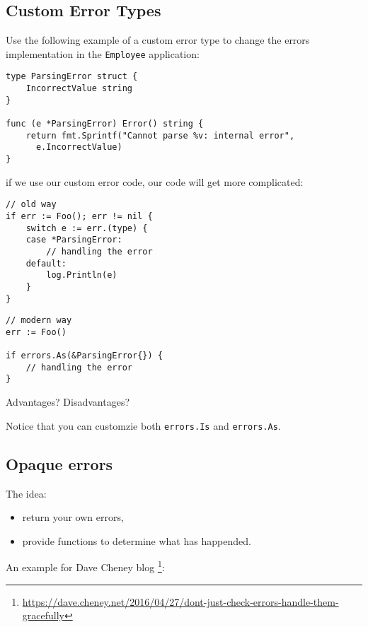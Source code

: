 \documentclass[11pt, letterpaper]{article}
\begin{document}
\subsection{Custom Error Types}

Use the following example of a custom error type to change the errors implementation in the \verb|Employee| application:

\begin{verbatim}
type ParsingError struct {
    IncorrectValue string
}

func (e *ParsingError) Error() string {
    return fmt.Sprintf("Cannot parse %v: internal error",
      e.IncorrectValue)
}
\end{verbatim}

if we use our custom error code, our code will get more complicated:

\begin{verbatim}
// old way
if err := Foo(); err != nil {
    switch e := err.(type) {
    case *ParsingError:
        // handling the error
    default:
        log.Println(e)
    }
}
\end{verbatim}

\begin{verbatim}
// modern way
err := Foo()

if errors.As(&ParsingError{}) {
	// handling the error
}
\end{verbatim}

Advantages? Disadvantages?
\bigskip

Notice that you can customzie both \texttt{errors.Is} and \texttt{errors.As}.
\pagebreak

\subsection{Opaque errors}

The idea:

\begin{itemize}
\item return your own errors,
\item provide functions to determine what has happended.
\end{itemize}

An example for Dave Cheney blog \footnote{\href{https://dave.cheney.net/2016/04/27/dont-just-check-errors-handle-them-gracefully}{https://dave.cheney.net/2016/04/27/dont-just-check-errors-handle-them-gracefully}}:
\end{document}
